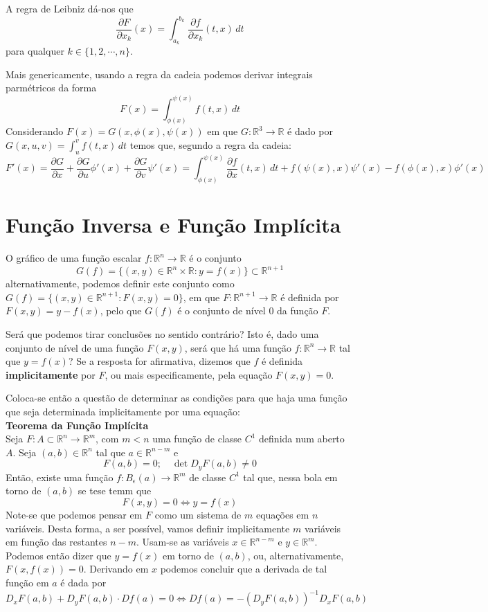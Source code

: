 \documentclass{article}
\newcommand{\R}{\mathbb{R}}
\begin{document}
A regra de Leibniz dá-nos que
$$
\frac{\partial F}{\partial x_k} (x) = \int_{a_k}^{b_k} \frac{\partial f}{\partial x_k} (t,x) \, dt
$$
para qualquer $k \in \{ 1, 2, \cdots , n \}$.

Mais genericamente, usando a regra da cadeia podemos derivar integrais parmétricos da forma
$$
F(x) = \int_{\phi(x)}^{\psi(x)} f(t,x) \, dt
$$
Considerando $F(x) = G(x, \phi(x), \psi(x))$ em que $G: \R^3 \to \R$ é dado por $G(x,u,v) = \int_u^v f(t,x) \, dt$ temos que, segundo a regra da cadeia:
$$
F'(x) = \frac{\partial G}{\partial x} + \frac{\partial G}{\partial u}\phi '(x) + \frac{\partial G}{\partial v} \psi '(x) = \int_{\phi(x)}^{\psi(x)} \frac{\partial f}{\partial x}(t,x) \, dt + f(\psi(x), x)\psi'(x) - f(\phi(x),x)\phi'(x)  
$$

\section{Função Inversa e Função Implícita}
O gráfico de uma função escalar $f: \R^n \to \R$ é o conjunto
$$ G(f) = \{(x,y) \in \R^n \times \R: y = f(x) \} \subset \R^{n+1} $$
alternativamente, podemos definir este conjunto como $G(f) = \{(x,y) \in \R^{n+1}: F(x,y) = 0 \}$, em que $F: \R^{n+1} \to \R$ é definida por $F(x,y) = y - f(x)$, pelo que $G(f)$ é o conjunto de nível 0 da função $F$.

Será que podemos tirar conclusões no sentido contrário? Isto é, dado uma conjunto de nível de uma função $F(x,y)$, será que há uma função $f: \R^n \to \R$ tal que $y = f(x)$? Se a resposta for afirmativa, dizemos que $f$ é definida \textbf{implicitamente} por $F$, ou mais especificamente, pela equação $F(x,y) = 0$.

Coloca-se então a questão de determinar as condições para que haja uma função que seja determinada implicitamente por uma equação:\\

\textbf{Teorema da Função Implícita}\\
Seja $F: A \subset \R^n \to \R^m$, com $m<n$ uma função de classe $C^1$ definida num aberto $A$. Seja $(a,b) \in \R^n$ tal que $a \in \R^{n-m}$ e 
$$
F(a,b) = 0; \quad \det D_yF(a,b) \neq 0
$$
Então, existe uma função $f: B_\epsilon(a) \to \R^m$ de classe $C^1$ tal que, nessa bola em torno de $(a,b)$ se tese temm que 
$$
F(x,y) = 0 \Leftrightarrow y = f(x)
$$
Note-se que podemos pensar em $F$ como um sistema de $m$ equações em $n$ variáveis. Desta forma, a ser possível, vamos definir implicitamente $m$ variáveis em função das restantes $n-m$.
Usam-se as variáveis $x \in \R^{n-m}$ e $y \in \R^m$. Podemos então dizer que $y=f(x)$ em torno de $(a,b)$, ou, alternativamente, $F(x, f(x)) = 0$. 
Derivando em $x$ podemos concluir que a derivada de tal função em $a$ é dada por
$$
D_xF(a,b) + D_yF(a,b) \cdot Df(a) = 0 \Leftrightarrow Df(a) = -(D_yF(a,b))^{-1} D_xF(a,b)
$$
\end{document}
